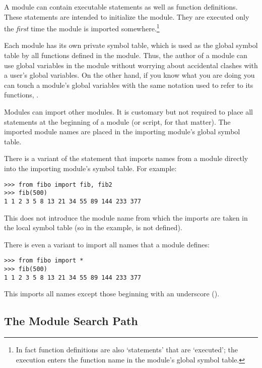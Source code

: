 \documentclass{manual}
\begin{document}
A module can contain executable statements as well as function
definitions.
These statements are intended to initialize the module.
They are executed only the
\emph{first}
time the module is imported somewhere.\footnote{
        In fact function definitions are also `statements' that are
        `executed'; the execution enters the function name in the
        module's global symbol table.
}

Each module has its own private symbol table, which is used as the
global symbol table by all functions defined in the module.
Thus, the author of a module can use global variables in the module
without worrying about accidental clashes with a user's global
variables.
On the other hand, if you know what you are doing you can touch a
module's global variables with the same notation used to refer to its
functions,
.

Modules can import other modules.
It is customary but not required to place all
statements at the beginning of a module (or script, for that matter).
The imported module names are placed in the importing module's global
symbol table.

There is a variant of the
statement that imports names from a module directly into the importing
module's symbol table.
For example:

\begin{verbatim}
>>> from fibo import fib, fib2
>>> fib(500)
1 1 2 3 5 8 13 21 34 55 89 144 233 377
\end{verbatim}

This does not introduce the module name from which the imports are taken
in the local symbol table (so in the example,  is not
defined).

There is even a variant to import all names that a module defines:

\begin{verbatim}
>>> from fibo import *
>>> fib(500)
1 1 2 3 5 8 13 21 34 55 89 144 233 377
\end{verbatim}

This imports all names except those beginning with an underscore
(\code{_}).

\subsection{The Module Search Path \label{searchPath}}

\end{document}
